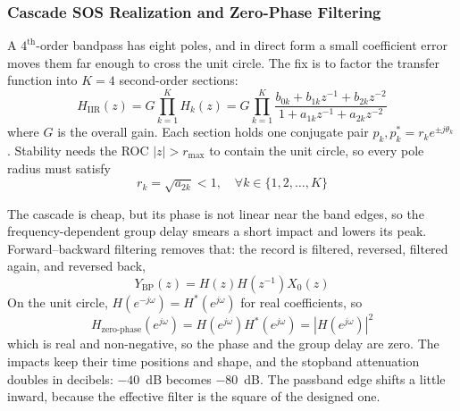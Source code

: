 \subsubsection{Cascade SOS Realization and Zero-Phase Filtering}
A $4^{\text{th}}$-order bandpass has eight poles, and in direct form a small
coefficient error moves them far enough to cross the unit circle. The fix is to
factor the transfer function into $K = 4$ second-order sections:
\begin{equation}
  H_{\text{IIR}}(z) = G \prod_{k=1}^{K} H_k(z) = G \prod_{k=1}^{K}
  \frac{b_{0k} + b_{1k}z^{-1} + b_{2k}z^{-2}}
       {1 + a_{1k}z^{-1} + a_{2k}z^{-2}}
\end{equation}
where $G$ is the overall gain. Each section holds one conjugate pair
$p_k, p_k^* = r_k e^{\pm j\theta_k}$. Stability needs the ROC $|z| > r_{\max}$
to contain the unit circle, so every pole radius must satisfy
\begin{equation}
  r_k = \sqrt{a_{2k}} < 1, \quad \forall k \in \{1, 2, \dots, K\}
\end{equation}

The cascade is cheap, but its phase is not linear near the band edges, so the
frequency-dependent group delay smears a short impact and lowers its peak.
Forward--backward filtering removes that: the record is filtered, reversed,
filtered again, and reversed back,
\begin{equation}
  Y_{\text{BP}}(z) = H(z) H(z^{-1}) X_0(z)
\end{equation}
On the unit circle, $H(e^{-j\omega}) = H^*(e^{j\omega})$ for real coefficients,
so
\begin{equation}
  H_{\text{zero-phase}}(e^{j\omega}) = H(e^{j\omega}) H^*(e^{j\omega}) =
  |H(e^{j\omega})|^2
\end{equation}
which is real and non-negative, so the phase and the group delay are zero. The
impacts keep their time positions and shape, and the stopband attenuation
doubles in decibels: $-40$~dB becomes $-80$~dB. The passband edge shifts a
little inward, because the effective filter is the square of the designed
one.
